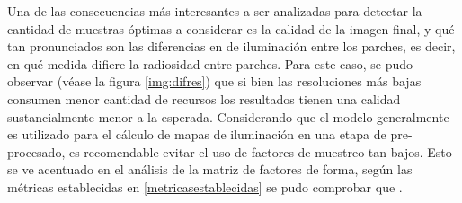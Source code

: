 
Una de las consecuencias más interesantes a ser analizadas para detectar la cantidad de muestras óptimas a considerar es la calidad de la imagen final, y qué tan pronunciados son las diferencias en de iluminación entre los parches, es decir, en qué medida difiere la radiosidad entre parches. Para este caso, se pudo observar (véase la figura \ref{img:difres}) que si bien las resoluciones más bajas consumen menor cantidad de recursos los resultados tienen una calidad sustancialmente menor a la esperada. Considerando que el modelo generalmente es utilizado para el cálculo de mapas de iluminación en una etapa de pre-procesado, es recomendable evitar el uso de factores de muestreo tan bajos. Esto se ve acentuado en el análisis de la matriz de factores de forma, según las métricas establecidas en \ref{metricasestablecidas} se pudo comprobar que .

